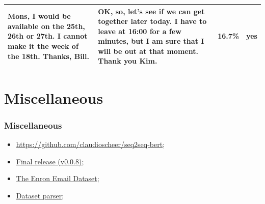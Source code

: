 \documentclass{beamer}
\begin{document}
\begin{frame}
\begin{table}
\begin{tabularx}{\textwidth}{|X|X|c|c|}
      \hline
      Mons, I would be available on the 25th, 26th or 27th. I cannot make it the week of the 18th. Thanks, Bill.                                                                                            & OK, so, let's see if we can get together later today. I have to leave at 16:00 for a few minutes, but I am sure that I will be out at that moment. Thank you Kim.                                                                  & \num{16.7}{\%} & yes                 \\
      \hline
    \end{tabularx}
  \end{table}
\end{frame}


\section{Miscellaneous}

\begin{frame}
  \frametitle{Miscellaneous}

  \begin{itemize}
    \item \href{https://github.com/claudioscheer/seq2seq-bert}{https://github.com/claudioscheer/seq2seq-bert};
    \item \href{https://github.com/claudioscheer/seq2seq-bert/releases/tag/v0.0.8-alpha}{Final release (v0.0.8)};
    \item \href{https://www.kaggle.com/wcukierski/enron-email-dataset}{The Enron Email Dataset};
    \item \href{https://www.kaggle.com/claudioscheer/extract-reply-emails}{Dataset parser};
  \end{itemize}
\end{frame}
\end{document}
